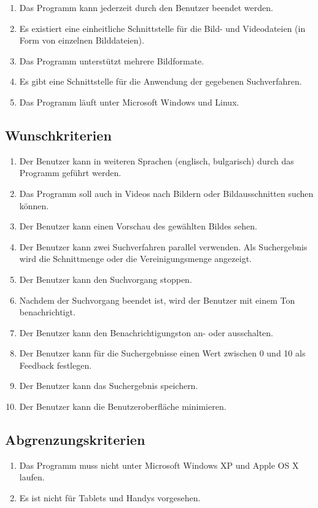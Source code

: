 \begin{enumerate} [label=\bfseries /MK \arabic*0/]
\item Das Programm kann jederzeit durch den Benutzer beendet werden.
\item Es existiert eine einheitliche Schnittstelle für die Bild- und Videodateien (in Form von einzelnen Bilddateien).
\item Das Programm unterstützt mehrere Bildformate.
\item Es gibt eine Schnittstelle für die Anwendung der gegebenen Suchverfahren.
\item Das Programm läuft unter Microsoft Windows und Linux.
\end{enumerate}
\subsection{Wunschkriterien}
\begin{enumerate} [label=\bfseries /WK \arabic*0/]
\item Der Benutzer kann in weiteren Sprachen (englisch, bulgarisch) durch das Programm geführt werden.
\item Das Programm soll auch in Videos nach Bildern oder Bildausschnitten suchen können.
\item Der Benutzer kann einen Vorschau des gewählten Bildes sehen.
\item Der Benutzer kann zwei Suchverfahren parallel verwenden. Als Suchergebnis wird die Schnittmenge oder die Vereinigungsmenge angezeigt.
\item Der Benutzer kann den Suchvorgang stoppen.
\item Nachdem der Suchvorgang beendet ist, wird der Benutzer mit einem Ton benachrichtigt.
\item Der Benutzer kann den Benachrichtigungston an- oder ausschalten.
\item Der Benutzer kann für die Suchergebnisse einen Wert zwischen 0 und 10 als Feedback festlegen.
\item Der Benutzer kann das Suchergebnis speichern.
\item Der Benutzer kann die Benutzeroberfläche minimieren.  
\end{enumerate}
\subsection{Abgrenzungskriterien}
\begin{enumerate} [label=\bfseries /AK \arabic*0/]
\item Das Programm muss nicht unter Microsoft Windows XP und Apple OS X laufen. 
\item Es ist nicht für Tablets und Handys vorgesehen.
\end{enumerate}
